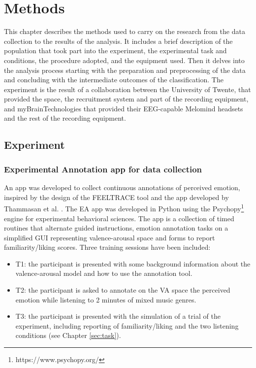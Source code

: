 \chapter{Methods}
\label{chap:methods}
This chapter describes the methods used to carry on the research from the data collection to the results of the analysis. It includes a brief description of the population that took part into the experiment, the experimental task and conditions, the procedure adopted, and the equipment used. Then it delves into the analysis process starting with the preparation and preprocessing of the data and concluding with the intermediate outcomes of the classification. The experiment is the result of a collaboration between the University of Twente, that provided the space, the recruitment system and part of the recording equipment, and myBrainTechnologies that provided their EEG-capable Melomind headsets and the rest of the recording equipment.

\section{Experiment}
\label{sec:experiment}
\subsection{Experimental Annotation app for data collection}
\label{sec:experimental_annotation_app}
An app was developed to collect continuous annotations of perceived emotion, inspired by the design of the FEELTRACE tool \cite{cowie_feeltrace_2000} and the app developed by Thammasan et al. \cite{thammasan_continuous_2016}. The \ac{EA} app was developed in Python using the Psychopy\footnote{https://www.psychopy.org/}  engine for experimental behavioral sciences. The app is a collection of timed routines that alternate guided instructions, emotion annotation tasks on a simplified GUI representing valence-arousal space and forms to report familiarity/liking scores. Three training sessions have been included:
\begin{itemize}
\item T1: the participant is presented with some background information about the valence-arousal model and how to use the annotation tool.
\item T2: the participant is asked to annotate on the \ac{VA} space the perceived emotion while listening to 2 minutes of mixed music genres.
\item T3: the participant is presented with the simulation of a trial of the experiment, including reporting of familiarity/liking and the two listening conditions (see Chapter \ref{sec:task}).
\end{itemize}

